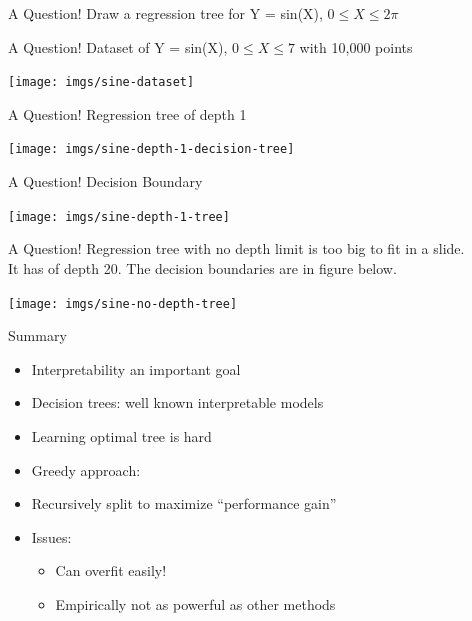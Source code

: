 \documentclass{beamer}
\begin{document}
\begin{frame}{A Question!}
Draw a regression tree for Y = sin(X), $0 \leq X \leq 2\pi$ 
\end{frame}

\begin{frame}{A Question!}
Dataset of Y = sin(X), $0 \leq X \leq 7$ with 10,000 points 
\begin{center}
\texttt{[image: imgs/sine-dataset]}
\end{center}
\end{frame}

\begin{frame}{A Question!}
Regression tree of depth 1
\begin{center}
\texttt{[image: imgs/sine-depth-1-decision-tree]}
\end{center}
\end{frame}

\begin{frame}{A Question!}
Decision Boundary
\begin{center}
\texttt{[image: imgs/sine-depth-1-tree]}
\end{center}
\end{frame}

\begin{frame}{A Question!}
Regression tree with no depth limit is too big to fit in a slide. \\
It has of depth 20. The decision boundaries are in figure below.\\
\begin{center}
\texttt{[image: imgs/sine-no-depth-tree]}
\end{center}
\end{frame}

\begin{frame}{Summary}
\begin{itemize}
	\item Interpretability an important goal
\item Decision trees: well known interpretable models
\item  Learning optimal tree is hard
\item  Greedy approach:
\item  Recursively split to maximize “performance gain”
\item  Issues:
\begin{itemize}
	\item Can overfit easily!
	\item  Empirically not as powerful as other methods
\end{itemize}
\end{itemize}

\end{frame}
\end{document}
